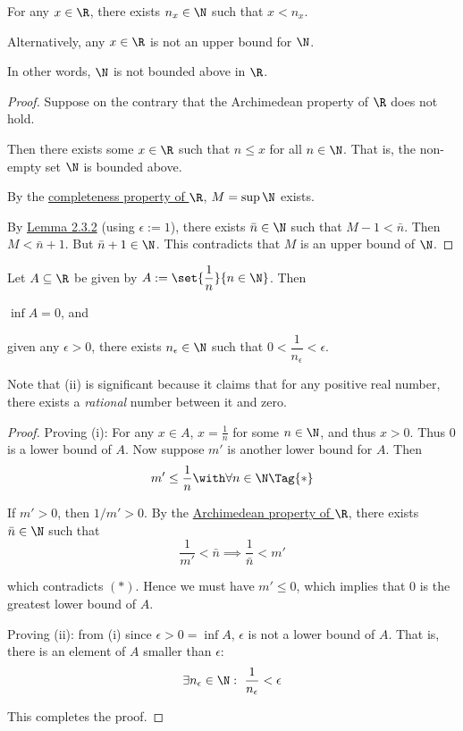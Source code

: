 \label{fbc2289}

For any $x\in\R$, there exists $n_x\in\N$ such that $x<n_x$.

Alternatively, any $x\in\R$ is not an upper bound for $\N$.

In other words, $\N$ is not bounded above in $\R$.

\begin{proof}
  Suppose on the contrary that the Archimedean property of $\R$ does not hold.

  Then there exists some $x\in\R$ such that $n\leq x$ for all $n\in\N$. That is,
  the non-empty set $\N$ is bounded above.

  By the \href{f330cf9}{completeness property of $\R$}, $M=\sup\N$ exists.

  By \href{f77f162}{Lemma 2.3.2} (using $\epsilon:=1$), there exists $\bar
  n\in\N$ such that $M-1<\bar n$. Then $M<\bar n+1$. But $\bar n+1\in\N$. This
  contradicts that $M$ is an upper bound of $\N$.
\end{proof}

\label{d845856}

Let $A\subseteq\R$ be given by $A:=\set{\dfrac1n}{n\in\N}$. Then
\begin{enumerati}
  \item $\inf A=0$, and
  \item given any $\epsilon>0$, there exists $n_\epsilon\in\N$ such that
  $0<\dfrac1{n_\epsilon}<\epsilon$.
\end{enumerati}

Note that (ii) is significant because it claims that for any positive real
number, there exists a \textit{rational} number between it and zero.

\begin{proof}
  Proving (i): For any $x\in A$, $x=\frac1n$ for some $n\in\N$, and thus $x>0$.
  Thus $0$ is a lower bound of $A$. Now suppose $m'$ is another lower bound for
  $A$. Then
  \begin{equation*}
    m'\leq\frac1n\with\forall n\in\N\Tag{*}
  \end{equation*}

  If $m'>0$, then $1/m'>0$. By the \href{fbc2289}{Archimedean property of $\R$},
  there exists $\bar n\in\N$ such that
  $$
    \frac1{m'}<\bar n\implies\frac1{\bar n}<m'
  $$

  which contradicts $(*)$. Hence we must have $m'\leq0$, which implies that 0 is
  the greatest lower bound of $A$.

  Proving (ii): from (i) since $\epsilon>0=\inf A$, $\epsilon$ is not a lower
  bound of $A$. That is, there is an element of $A$ smaller than $\epsilon$:
  $$
    \exists n_\epsilon\in\N:\ \frac1{n_\epsilon}<\epsilon
  $$

  This completes the proof.
\end{proof}

